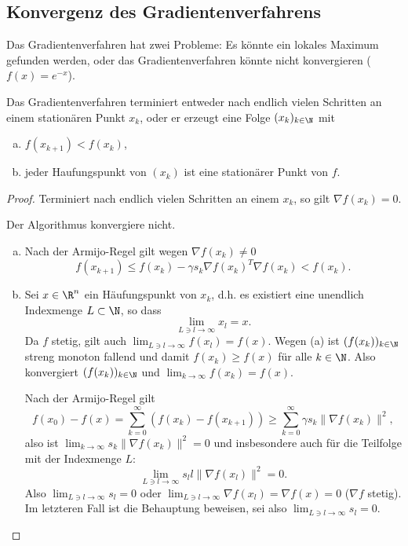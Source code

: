 
\subsection{Konvergenz des Gradientenverfahrens}

Das Gradientenverfahren hat zwei Probleme:
Es könnte ein lokales Maximum gefunden werden, oder das Gradientenverfahren könnte nicht konvergieren ($f(x) = e^{-x}$).

\begin{st} \label{2.24}
	Das Gradientenverfahren %
	terminiert entweder nach endlich vielen Schritten an einem stationären Punkt $x_k$, oder er erzeugt eine Folge $(x_k)_{k\in\N}$ mit
	\begin{enumerate}[(a)]
		\item
			$f(x_{k+1}) < f(x_k)$,
		\item
			jeder Haufungspunkt von $(x_k)$ ist eine stationärer Punkt von $f$.
	\end{enumerate}
	\begin{proof}
		Terminiert %
		nach endlich vielen Schritten an einem $x_k$, so gilt $\nabla f(x_k) = 0$.

		Der Algorithmus konvergiere nicht.
		\begin{enumerate}[a)]
			\item
				Nach der Armijo-Regel gilt wegen $\nabla f(x_k) \neq 0$
				\[
					f(x_{k+1})
					\le f(x_k) - \gamma s_k \nabla f(x_k)^T \nabla f(x_k)
					< f(x_k).
				\]
			\item
				Sei $x \in \R^n$ ein Häufungspunkt von $x_k$, d.h. es existiert eine unendlich Indexmenge $L \subset \N$, so dass
				\[
					\lim_{L \ni l \to \infty} x_l = x.
				\]
				Da $f$ stetig, gilt auch $\lim_{L \ni l \to \infty} f(x_l) = f(x)$.
				Wegen (a) ist $(f(x_k))_{k\in\N}$ streng monoton fallend und damit $f(x_k) \ge f(x)$ für alle $k \in \N$.
				Also konvergiert $(f(x_k))_{k\in\N}$ und $\lim_{k\to \infty} f(x_k) = f(x)$.

				Nach der Armijo-Regel gilt
				\[
					f(x_0) - f(x)
					= \sum_{k=0}^\infty (f(x_k) - f(x_{k+1}))
					\ge \sum_{k=0}^\infty \gamma s_k \| \nabla f(x_k) \|^2,
				\]
				also ist $\lim_{k\to\infty} s_k \|\nabla f(x_k)\|^2 = 0$ und insbesondere auch für die Teilfolge mit der Indexmenge $L$:
				\[
					\lim_{L \ni l \to \infty} s_ll \|\nabla f(x_l)\|^2 = 0.
				\]
				Also $\lim_{L \ni l \to \infty} s_l = 0$ oder $\lim_{L \ni l \to\infty} \nabla f(x_l) = \nabla f(x) = 0$ ($\nabla f$ stetig).
				Im letzteren Fall ist die Behauptung beweisen, sei also $\lim_{L \ni l \to \infty} s_l = 0$.


\end{enumerate}
\end{proof}
\end{st}
